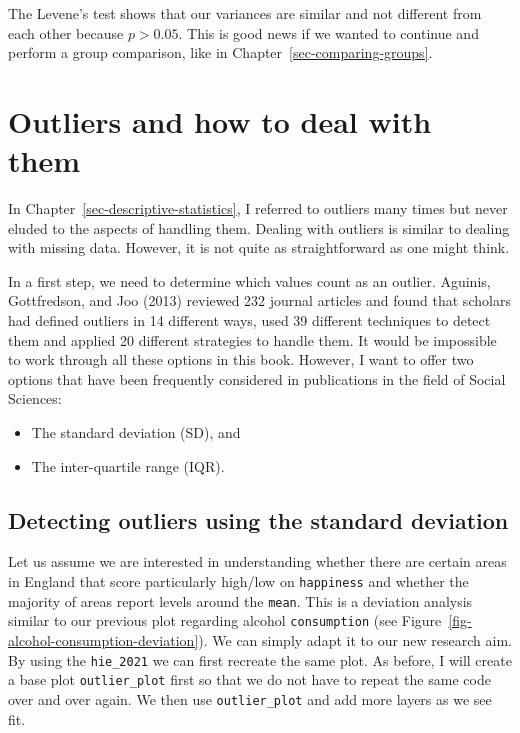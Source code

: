 \documentclass[
  letterpaper,
  DIV=11,
  numbers=noendperiod]{scrreprt}
\begin{document}
The Levene's test shows that our variances are similar and not different
from each other because \(p > 0.05\). This is good news if we wanted to
continue and perform a group comparison, like in
Chapter~\ref{sec-comparing-groups}.

\section{Outliers and how to deal with
them}\label{sec-dealing-with-outliers}

In Chapter~\ref{sec-descriptive-statistics}, I referred to outliers many
times but never eluded to the aspects of handling them. Dealing with
outliers is similar to dealing with missing data. However, it is not
quite as straightforward as one might think.

In a first step, we need to determine which values count as an outlier.
Aguinis, Gottfredson, and Joo (2013) reviewed 232 journal articles and
found that scholars had defined outliers in 14 different ways, used 39
different techniques to detect them and applied 20 different strategies
to handle them. It would be impossible to work through all these options
in this book. However, I want to offer two options that have been
frequently considered in publications in the field of Social Sciences:

\begin{itemize}
\item
  The standard deviation (SD), and
\item
  The inter-quartile range (IQR).
\end{itemize}

\subsection{Detecting outliers using the standard
deviation}\label{sec-ouliers-standard_deviation}

Let us assume we are interested in understanding whether there are
certain areas in England that score particularly high/low on
\texttt{happiness} and whether the majority of areas report levels
around the \texttt{mean}. This is a deviation analysis similar to our
previous plot regarding alcohol \texttt{consumption} (see
Figure~\ref{fig-alcohol-consumption-deviation}). We can simply adapt it
to our new research aim. By using the \texttt{hie\_2021} we can first
recreate the same plot. As before, I will create a base plot
\texttt{outlier\_plot} first so that we do not have to repeat the same
code over and over again. We then use \texttt{outlier\_plot} and add
more layers as we see fit.
\end{document}
